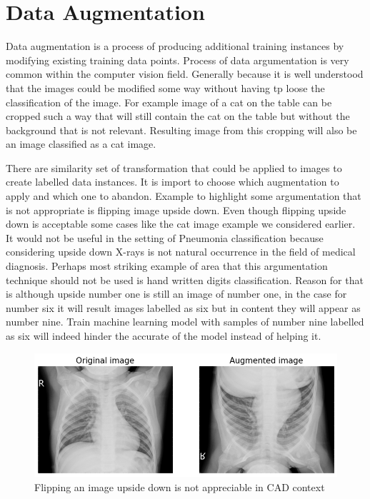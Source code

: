\section{Data Augmentation}
Data augmentation is a process of producing additional training instances by modifying existing training data points.
Process of data argumentation is very common within the computer vision field.
Generally because it is well understood that the images could be modified some way without having tp loose the classification of the image.
For example image of a cat on the table can be cropped such a way that will still contain the cat on the table but without the background that is not relevant.
Resulting image from this cropping will also be an image classified as a cat image.

There are similarity set of transformation that could be applied to images to create labelled data instances. 
It is import to choose which augmentation to apply and which one to abandon.
Example to highlight some argumentation that is not appropriate is flipping image upside down. 
Even though flipping upside down is acceptable some cases like the cat image example we considered earlier. 
It would not be useful in the setting of Pneumonia classification because considering upside down X-rays is not natural occurrence in the field of medical diagnosis.
Perhaps most striking example of area that this argumentation technique should not be used is hand written digits classification. 
Reason for that is although upside number one is still an image of number one, in the case for number six it will result images labelled as six but in content they will appear as number nine. 
Train machine learning model with samples of number nine labelled as six will indeed hinder the accurate of the model instead of helping it.

\begin{figure}[H]
    \centering
    \includegraphics[width=\textwidth]{img/augmented-image-1588951790.png}
    \caption{Flipping an image upside down is not appreciable in CAD context}
    \label{fig:upsidedownxray}
  \end{figure}


